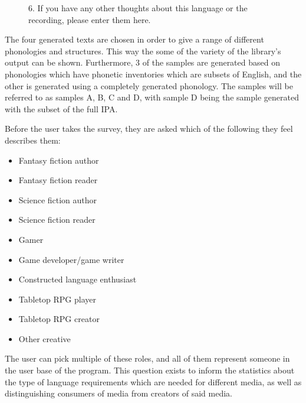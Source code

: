 \documentclass{report}
\begin{document}
\begin{figure}
\begin{tcolorbox}
			\underline{\hspace{10cm}}
			\underline{\hspace{10cm}}
			\underline{\hspace{10cm}}
			\vspace{0.3cm}
			
			6. If you have any other thoughts about this language or the recording, please enter them here.
			
			\underline{\hspace{10cm}}
			\underline{\hspace{10cm}}
			\underline{\hspace{10cm}}
			
		\end{tcolorbox}
	\end{figure}

	The four generated texts are chosen in order to give a range of different phonologies and structures. This way the some of the variety of the library's output can be shown. Furthermore, 3 of the samples are generated based on phonologies which have phonetic inventories which are subsets of English, and the other is generated using a completely generated phonology. The samples will be referred to as samples \textsc{A, B, C} and \textsc{D}, with sample \textsc{D} being the sample generated with the subset of the full IPA.
	
	Before the user takes the survey, they are asked which of the following they feel describes them:
	
	\begin{itemize}
		\item Fantasy fiction author
		\item Fantasy fiction reader
		\item Science fiction author
		\item Science fiction reader
		\item Gamer
		\item Game developer/game writer
		\item Constructed language enthusiast
		\item Tabletop RPG player
		\item Tabletop RPG creator
		\item Other creative
	\end{itemize}

	The user can pick multiple of these roles, and all of them represent someone in the user base of the program. This question exists to inform the statistics about the type of language requirements which are needed for different media, as well as distinguishing consumers of media from creators of said media.
	
\end{document}
